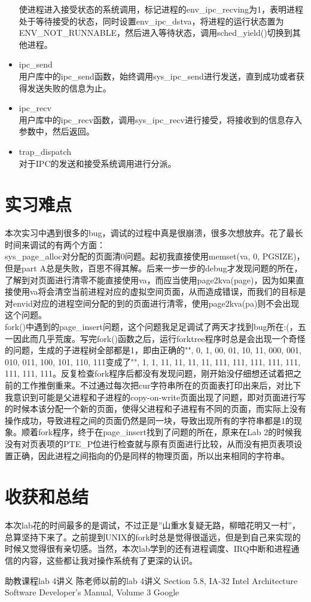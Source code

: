 \documentclass[11pt,a4paper]{article}
\begin{document}
\begin{itemize}
使进程进入接受状态的系统调用，标记进程的env\_ipc\_recving为1，表明进程处于等待接受的状态，同时设置env\_ipc\_dstva，将进程的运行状态置为ENV\_NOT\_RUNNABLE，然后进入等待状态，调用sched\_yield()切换到其他进程。
\item ipc\_send\\
用户库中的ipc\_send函数，始终调用sys\_ipc\_send进行发送，直到成功或者获得发送失败的信息为止。
\item ipc\_recv\\
用户库中的ipc\_recv函数，调用sys\_ipc\_recv进行接受，将接收到的信息存入参数中，然后返回。
\item trap\_dispatch\\
对于IPC的发送和接受系统调用进行分派。
\end{itemize}


\section{实习难点}
本次实习中遇到很多的bug，调试的过程中真是很崩溃，很多次想放弃。花了最长时间来调试的有两个方面：\\

sys\_page\_alloc对分配的页面清0问题。起初我直接使用memset(va, 0, PGSIZE)，但是part A总是失败，百思不得其解。后来一步一步的debug才发现问题的所在，了解到对页面进行清零不能直接使用va，而应当使用page2kva(page)，因为如果直接使用va将会清空当前进程对应的虚拟空间页面，从而造成错误，而我们的目标是对envid对应的进程空间分配的到的页面进行清零，使用page2kva(pa)则不会出现这个问题。\\

fork()中遇到的page\_insert问题，这个问题我足足调试了两天才找到bug所在:(，五一因此而几乎荒废。写完fork()函数之后，运行forktree程序时总是会出现一个奇怪的问题，生成的子进程树全部都是1，即由正确的"", 0, 1, 00, 01, 10, 11, 000, 001, 010, 011, 100, 101, 110, 111变成了"", 1, 1, 11, 11, 11, 11, 111, 111, 111, 111, 111, 111, 111, 111。反复检查fork程序后都没有发现问题，刚开始没仔细想还试着把之前的工作推倒重来。不过通过每次把cur字符串所在的页面表打印出来后，对比下我意识到可能是父进程和子进程的copy-on-write页面出现了问题，即对页面进行写的时候本该分配一个新的页面，使得父进程和子进程有不同的页面，而实际上没有操作成功，导致进程之间的页面仍然是同一块，导致出现所有的字符串都是1的现象。顺着fork程序，终于在page\_insert找到了问题的所在，原来在Lab 2的时候我没有对页表项的PTE\_P位进行检查就与原有页面进行比较，从而没有把页表项设置正确，因此进程之间指向的仍是同样的物理页面，所以出来相同的字符串。

\section{收获和总结}
本次lab花的时间最多的是调试，不过正是”山重水复疑无路，柳暗花明又一村”，总算坚持下来了。之前提到UNIX的fork时总是觉得很遥远，但是到自己来实现的时候又觉得很有亲切感。当然，本次lab学到的还有进程调度、IRQ中断和进程通信的内容，这些都让我对操作系统有了更深的认识。

\begin{thebibliography}{10}
 助教课程lab 4讲义
 陈老师以前的lab 4讲义
 Section 5.8, IA-32 Intel Architecture Software Developer's Manual, Volume 3
 Google
\end{thebibliography}
\end{document}

